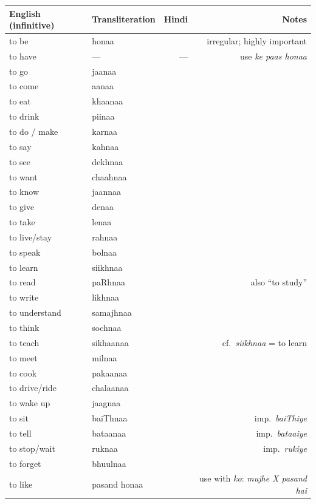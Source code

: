 \begin{tabular}{@{}VTDN@{}}
  \toprule
  English (infinitive) & Transliteration & Hindi & Notes \\
  \midrule
  to be         & honaa    &     & irregular; highly important \\
  to have       & —        & —            & use \textit{ke paas honaa} \\
  to go         & jaanaa   &    & \\
  to come       & aanaa    &     & \\
  to eat        & khaanaa  &    & \\
  to drink      & piinaa   &    & \\
  to do / make  & karnaa   &    & \\
  to say        & kahnaa   &    & \\
  to see        & dekhnaa  &   & \\
  to want       & chaahnaa &   & \\
  to know       & jaannaa  &   & \\
  to give       & denaa    &    & \\
  to take       & lenaa    &    & \\
  to live/stay  & rahnaa   &    & \\
  to speak      & bolnaa   &   & \\
  to learn      & siikhnaa &   & \\
  to read       & paRhnaa &   & also ``to study'' \\
  to write      & likhnaa  &   & \\
  to understand & samajhnaa &  & \\
  to think      & sochnaa   &       & \\
  to teach      & sikhaanaa &      & cf.\ \textit{siikhnaa} = to learn \\
  to meet       & milnaa    &       & \\
  to cook       & pakaanaa  &       & \\
  to drive/ride & chalaanaa &       & \\
  to wake up    & jaagnaa   &       & \\
  to sit        & baiThnaa  &       & imp.\ \textit{baiThiye} \\
  to tell       & bataanaa  &       & imp.\ \textit{bataaiye} \\
  to stop/wait  & ruknaa    &       & imp.\ \textit{rukiye} \\
  to forget     & bhuulnaa  &       & \\
  to like       & pasand honaa &  & use with \textit{ko}: \textit{mujhe X pasand hai} \\
  \bottomrule
\end{tabular}

